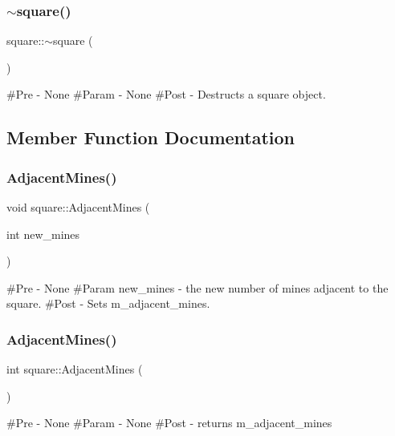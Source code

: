 \subsubsection{\texorpdfstring{$\sim$square()}{~square()}}
{\footnotesize\ttfamily square\+::$\sim$square (\begin{DoxyParamCaption}{ }\end{DoxyParamCaption})}

\#\+Pre -\/ None \#\+Param -\/ None \#\+Post -\/ Destructs a square object. 

\subsection{Member Function Documentation}
\mbox{\label{classsquare_a25e18a690d8096805b4ddcb97dbbf642}} 
\subsubsection{\texorpdfstring{AdjacentMines()}{AdjacentMines()}\hspace{0.1cm}{\footnotesize\ttfamily [1/2]}}
{\footnotesize\ttfamily void square\+::\+Adjacent\+Mines (\begin{DoxyParamCaption}\item[{int}]{new\+\_\+mines }\end{DoxyParamCaption})}

\#\+Pre -\/ None \#\+Param new\+\_\+mines -\/ the new number of mines adjacent to the square. \#\+Post -\/ Sets m\+\_\+adjacent\+\_\+mines. \mbox{\label{classsquare_a168cd493b64467001a305ca1298b91f5}} 
\subsubsection{\texorpdfstring{AdjacentMines()}{AdjacentMines()}\hspace{0.1cm}{\footnotesize\ttfamily [2/2]}}
{\footnotesize\ttfamily int square\+::\+Adjacent\+Mines (\begin{DoxyParamCaption}{ }\end{DoxyParamCaption})}

\#\+Pre -\/ None \#\+Param -\/ None \#\+Post -\/ returns m\+\_\+adjacent\+\_\+mines \mbox{\label{classsquare_a0a16171bace3d7e23c4b40bad476f32a}} 
